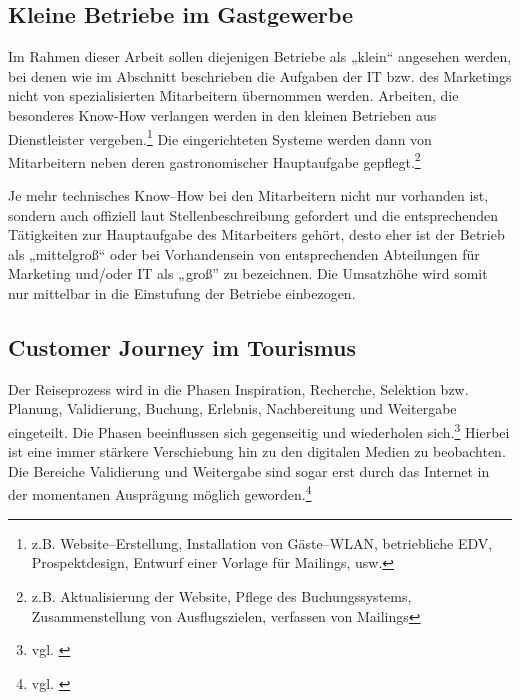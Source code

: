 \subsection{Kleine Betriebe im Gastgewerbe} %
\label{sub:kleine_betriebe_im_gastgewerbe}
Im Rahmen dieser Arbeit sollen diejenigen Betriebe als „klein“ angesehen werden, bei denen wie im Abschnitt  beschrieben die Aufgaben der IT bzw. des Marketings nicht von spezialisierten Mitarbeitern übernommen werden. Arbeiten, die besonderes Know-How verlangen werden in den kleinen Betrieben aus Dienstleister vergeben.\footnote{z.B. Website–Erstellung, Installation von Gäste–WLAN, betriebliche EDV, Prospektdesign, Entwurf einer Vorlage für Mailings, usw.} Die eingerichteten Systeme werden dann von Mitarbeitern neben deren gastronomischer Hauptaufgabe gepflegt.\footnote{z.B. Aktualisierung der Website, Pflege des Buchungssystems, Zusammenstellung von Ausflugszielen, verfassen von Mailings}

Je mehr technisches Know–How bei den Mitarbeitern nicht nur vorhanden ist, sondern auch offiziell laut Stellenbeschreibung gefordert und die entsprechenden Tätigkeiten zur Hauptaufgabe des Mitarbeiters gehört, desto eher ist der Betrieb als „mittelgroß“ oder bei Vorhandensein von entsprechenden Abteilungen für Marketing und/oder IT als „groß” zu bezeichnen. Die Umsatzhöhe wird somit nur mittelbar in die Einstufung der Betriebe einbezogen.

\subsection{Customer Journey im Tourismus} %
\label{sub:customer_journey_im_tourismus}
Der Reiseprozess wird in die Phasen Inspiration, Recherche, Selektion bzw. Planung, Validierung, Buchung, Erlebnis, Nachbereitung und Weitergabe eingeteilt. Die Phasen beeinflussen sich gegenseitig und wiederholen sich.\footnote{vgl. \cite{cole:7step}}
Hierbei ist eine immer stärkere Verschiebung hin zu den digitalen Medien zu beobachten. Die Bereiche Validierung und Weitergabe sind sogar erst durch das Internet in der momentanen Ausprägung möglich geworden.\footnote{vgl. \cite{buhl}}

